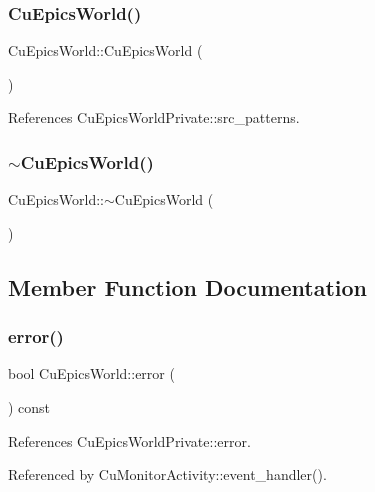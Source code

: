 \subsubsection{Cu\+Epics\+World()}
{\footnotesize\ttfamily Cu\+Epics\+World\+::\+Cu\+Epics\+World (\begin{DoxyParamCaption}{ }\end{DoxyParamCaption})}



References Cu\+Epics\+World\+Private\+::src\+\_\+patterns.

\mbox{\label{classCuEpicsWorld_a48e6dc05f7b79752047a3cf20ea4b61b}} 
\subsubsection{$\sim$\+Cu\+Epics\+World()}
{\footnotesize\ttfamily Cu\+Epics\+World\+::$\sim$\+Cu\+Epics\+World (\begin{DoxyParamCaption}{ }\end{DoxyParamCaption})\hspace{0.3cm}{\ttfamily [virtual]}}



\subsection{Member Function Documentation}
\mbox{\label{classCuEpicsWorld_a01c2f45af889d0bf2f2a1f0dae877624}} 
\subsubsection{error()}
{\footnotesize\ttfamily bool Cu\+Epics\+World\+::error (\begin{DoxyParamCaption}{ }\end{DoxyParamCaption}) const}



References Cu\+Epics\+World\+Private\+::error.



Referenced by Cu\+Monitor\+Activity\+::event\+\_\+handler().

\mbox{\label{classCuEpicsWorld_ada0feac3aef6923b41d9913664d96e88}} 
